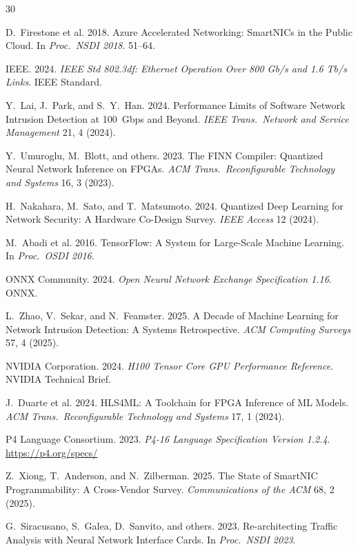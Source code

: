 \documentclass[sigconf,nonacm]{acmart}
\begin{document}
\sloppy

\begin{thebibliography}{30}

D.~Firestone et al. 2018. Azure Accelerated Networking: SmartNICs in
the Public Cloud. In \textit{Proc.\ NSDI 2018}. 51--64.

IEEE. 2024. \textit{IEEE Std 802.3df: Ethernet Operation Over 800
Gb/s and 1.6 Tb/s Links}. IEEE Standard.

Y.~Lai, J.~Park, and S.~Y.~Han. 2024. Performance Limits of Software
Network Intrusion Detection at 100~Gbps and Beyond. \textit{IEEE
Trans.\ Network and Service Management} 21, 4 (2024).

Y.~Umuroglu, M.~Blott, and others. 2023. The FINN Compiler:
Quantized Neural Network Inference on FPGAs. \textit{ACM Trans.\
Reconfigurable Technology and Systems} 16, 3 (2023).

H.~Nakahara, M.~Sato, and T.~Matsumoto. 2024. Quantized Deep Learning
for Network Security: A Hardware Co-Design Survey. \textit{IEEE
Access} 12 (2024).

M.~Abadi et al. 2016. TensorFlow: A System for Large-Scale Machine
Learning. In \textit{Proc.\ OSDI 2016}.

ONNX Community. 2024. \textit{Open Neural Network Exchange Specification
1.16}. ONNX.

L.~Zhao, V.~Sekar, and N.~Feamster. 2025. A Decade of Machine Learning
for Network Intrusion Detection: A Systems Retrospective.
\textit{ACM Computing Surveys} 57, 4 (2025).

NVIDIA Corporation. 2024. \textit{H100 Tensor Core GPU Performance
Reference}. NVIDIA Technical Brief.

J.~Duarte et al. 2024. HLS4ML: A Toolchain for FPGA Inference of
ML Models. \textit{ACM Trans.\ Reconfigurable Technology and Systems}
17, 1 (2024).

P4 Language Consortium. 2023. \textit{P4-16 Language Specification
Version 1.2.4}. \url{https://p4.org/specs/}

Z.~Xiong, T.~Anderson, and N.~Zilberman. 2025. The State of SmartNIC
Programmability: A Cross-Vendor Survey. \textit{Communications of
the ACM} 68, 2 (2025).

G.~Siracusano, S.~Galea, D.~Sanvito, and others. 2023. Re-architecting
Traffic Analysis with Neural Network Interface Cards. In
\textit{Proc.\ NSDI 2023}.


\end{thebibliography}
\end{document}
